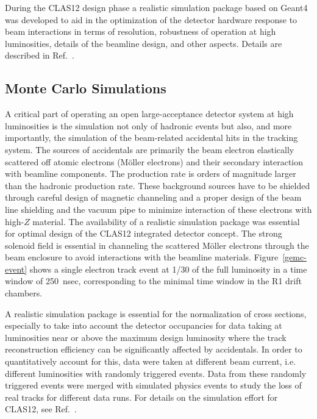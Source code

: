 \documentclass[final,3p,twocolumn]{elsarticle}
\begin{document}
During the CLAS12 design phase a realistic simulation package based on Geant4 was developed to aid in the optimization 
of the detector hardware response to beam interactions in terms of resolution, robustness of operation at high luminosities, details of the beamline design, and other aspects.   Details are described in Ref.~\cite{Software}. 

\subsection{\rm Monte Carlo Simulations} 
A critical part of operating an open large-acceptance detector system at high luminosities is the 
simulation not only of hadronic
events but also, and more importantly, the simulation of the beam-related accidental hits in the tracking system. The 
sources of accidentals are primarily the beam electron elastically scattered off atomic electrons (M{\"o}ller electrons) and their secondary interaction 
with beamline components. The production rate is orders of magnitude larger than the hadronic production rate. 
These background sources have to be shielded through careful design of magnetic channeling and a proper design of  the beam line shielding
 and the vacuum pipe to minimize interaction of these electrons with high-$Z$ material. The availability of a realistic 
 simulation package was essential for optimal design of the CLAS12 integrated detector concept. The strong solenoid field 
 is essential in channeling the scattered M{\"o}ller electrons through the beam enclosure to avoid interactions with the 
 beamline materials. Figure~\ref{gemc-event}  shows a single electron track event at 1/30 of the full luminosity in a time window of 250~nsec, corresponding to the minimal time 
 window in the R1 drift chambers. 
 
 A realistic simulation package is essential for the normalization of cross sections, especially to take into account the 
 detector occupancies for data taking at luminosities near or above the maximum design luminosity where the track 
 reconstruction efficiency can be significantly affected by accidentals. In order to quantitatively account for this, data were taken at different beam current, i.e. different luminosities with randomly triggered events. Data from these 
 randomly triggered events were merged with simulated physics events to study the loss of real tracks for different 
 data runs. For details on the simulation effort for CLAS12, see Ref.~\cite{GEMC}.    

\end{document}
